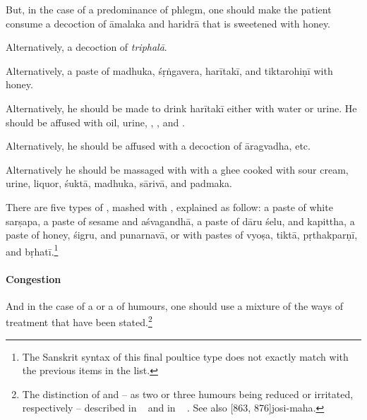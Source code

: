\begin{translation}
\item[10]

But, in the case of a predominance of
phlegm, one should make the patient 
consume a decoction of
\gls{āmalaka} and \gls{haridrā} that is sweetened with honey.  

Alternatively, a decoction of \textit{triphalā}.

Alternatively, a paste of \gls{madhuka}, \gls{śṛṅgavera},
\gls{harītakī}, and \gls{tiktarohiṇī} with honey. 

Alternatively, he should be made to drink
\gls{harītakī} either with water or urine.   He should be
affused with oil, urine, ,  , and . 
   
Alternatively, he should be affused  with a decoction of \gls{āragvadha}, etc.

Alternatively he should be massaged with 
with a ghee cooked with
sour cream, urine, liquor, \gls{śuktā}, \gls{madhuka},
    \gls{sārivā}, and \gls{padmaka}.
    
\label{pradeha}
There are five types of , mashed with
, explained as follow: %
a paste of white \gls{sarṣapa}, %
a paste of sesame and \gls{aśvagandhā}, %
a paste of \gls{dāru} \gls{śelu}, and \gls{kapittha}, %
a paste of honey, \gls{śigru}, and \gls{punarnavā}, %
or with pastes of \gls{vyoṣa}, \gls{tiktā}, \gls{pṛthakparṇī}, and
\gls{bṛhatī}.\footnote{The Sanskrit syntax of this final poultice type does not
    exactly match with the previous items in the list.}
    
    
\paragraph{Congestion}
    
\item[11] 

And in the case of a  or  a
 of humours, one should use a mixture of the
ways of treatment that have been stated.\footnote{The distinction of
     and  -- as two or
    three humours being reduced or irritated, respectively -- described in
    \CS\  and in \AH\ 
    \parencite[tr.][206]{wuja-2003}. See also [863,
    876]{josi-maha}.}

\item[12]


\end{translation}
